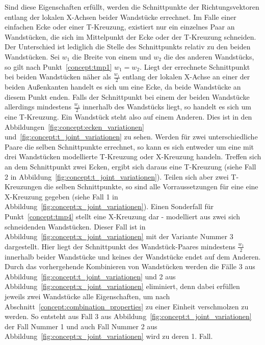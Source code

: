 Sind diese Eigenschaften erfüllt, werden die Schnittpunkte der Richtungsvektoren entlang der lokalen X-Achsen beider Wandstücke errechnet.
Im Falle einer einfachen Ecke oder einer T-Kreuzung, existiert nur ein einzelnes Paar an Wandstücken, die sich im Mittelpunkt der Ecke oder der T-Kreuzung schneiden.
Der Unterschied ist lediglich die Stelle des Schnittpunkts relativ zu den beiden Wandstücken.
Sei \(w_1\) die Breite von einem und \(w_2\) die des anderen Wandstücks, so gilt nach Punkt~\ref{concept:tmp1} \(w_1 = w_2\).
Liegt der errechnete Schnittpunkt bei beiden Wandstücken näher als \(\frac{w_1}{2}\) entlang der lokalen X-Achse an einer der beiden Außenkanten handelt es sich um eine Ecke, da beide Wandstücke an diesem Punkt enden.
Falls der Schnittpunkt bei einem der beiden Wandstücke allerdings mindestens  \(\frac{w_1}{2}\) innerhalb des Wandstücks liegt, so handelt es sich um eine T-Kreuzung.
Ein Wandstück steht also auf einem Anderen.
Dies ist in den Abbildungen~\ref{fig:concept:ecken_variationen} und~\ref{fig:concept:t_joint_variationen} zu sehen. 
Werden für zwei unterschiedliche Paare die selben Schnittpunkte errechnet, so kann es sich entweder um eine mit drei Wandstücken modellierte T-Kreuzung oder X-Kreuzung handeln.
Treffen sich an dem Schnittpunkt zwei Ecken, ergibt sich daraus eine T-Kreuzung (siehe Fall 2 in Abbildung~\ref{fig:concept:t_joint_variationen}).
Teilen sich aber zwei T-Kreuzungen die selben Schnittpunkte, so sind alle Vorraussetzungen für eine eine X-Kreuzung gegeben (siehe Fall 1 in Abbildung~\ref{fig:concept:x_joint_variationen}).
Einen Sonderfall für Punkt~\ref{concept:tmp4} stellt eine X-Kreuzung dar - modelliert aus zwei sich schneidenden Wandstücken.
Dieser Fall ist in Abbildung~\ref{fig:concept:x_joint_variationen} mit der Variante Nummer 3 dargestellt.
Hier liegt der Schnittpunkt des Wandstück-Paares mindestens \(\frac{w_1}{2}\) innerhalb beider Wandstücke und keines der Wandstücke endet auf dem Anderen.
Durch das vorhergehende Kombinieren von Wandstücken werden die Fälle 3 aus Abbildung~\ref{fig:concept:t_joint_variationen} und 2 aus Abbildung~\ref{fig:concept:x_joint_variationen} eliminiert, denn dabei erfüllen jeweils zwei Wandstücke alle Eigenschaften, um nach Abschnitt~\ref{concept:combination_properties} zu einer Einheit verschmolzen zu werden.
So entsteht aus Fall 3 aus Abbildung~\ref{fig:concept:t_joint_variationen} der Fall Nummer 1 und auch Fall Nummer 2 aus Abbildung~\ref{fig:concept:x_joint_variationen} wird zu deren 1. Fall.

